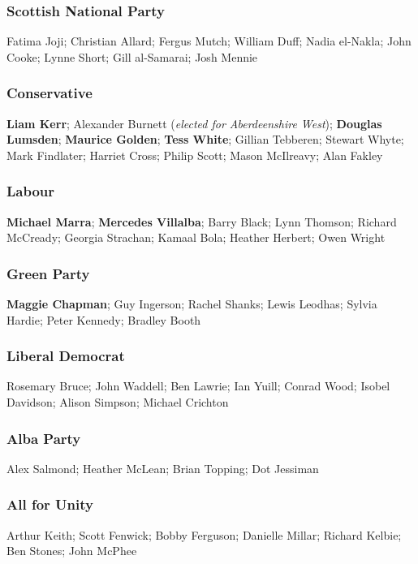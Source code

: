 \begin{resultsiii}
\subsubsection*{Scottish National Party}
Fatima Joji; Christian Allard; Fergus Mutch; William Duff; Nadia el-Nakla; John Cooke; Lynne Short; Gill al-Samarai; Josh Mennie

\subsubsection*{Conservative}
\textbf{Liam Kerr}; Alexander Burnett (\emph{elected for Aberdeenshire West}); \textbf{Douglas Lumsden}; \textbf{Maurice Golden}; \textbf{Tess White}; Gillian Tebberen; Stewart Whyte; Mark Findlater; Harriet Cross; Philip Scott; Mason McIlreavy; Alan Fakley

\subsubsection*{Labour}
\textbf{Michael Marra}; \textbf{Mercedes Villalba}; Barry Black; Lynn Thomson; Richard McCready; Georgia Strachan; Kamaal Bola; Heather Herbert; Owen Wright

\subsubsection*{Green Party}
\textbf{Maggie Chapman}; Guy Ingerson; Rachel Shanks; Lewis Leodhas; Sylvia Hardie; Peter Kennedy; Bradley Booth

\subsubsection*{Liberal Democrat}
Rosemary Bruce; John Waddell; Ben Lawrie; Ian Yuill; Conrad Wood; Isobel Davidson; Alison Simpson; Michael Crichton

\subsubsection*{Alba Party}
Alex Salmond; Heather McLean; Brian Topping; Dot Jessiman

\subsubsection*{All for Unity}
Arthur Keith; Scott Fenwick; Bobby Ferguson; Danielle Millar; Richard Kelbie; Ben Stones; John McPhee


\end{resultsiii}
